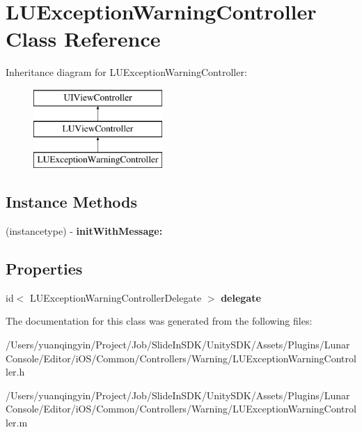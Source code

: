 \hypertarget{interface_l_u_exception_warning_controller}{}\section{L\+U\+Exception\+Warning\+Controller Class Reference}
\label{interface_l_u_exception_warning_controller}
Inheritance diagram for L\+U\+Exception\+Warning\+Controller\+:\begin{figure}[H]
\begin{center}
\leavevmode
\includegraphics[height=3.000000cm]{interface_l_u_exception_warning_controller}
\end{center}
\end{figure}
\subsection*{Instance Methods}
\begin{DoxyCompactItemize}
\item 
\mbox{\label{interface_l_u_exception_warning_controller_a66c26ff34fdbbdfbe09c7026353978eb}} 
(instancetype) -\/ {\bfseries init\+With\+Message\+:}
\end{DoxyCompactItemize}
\subsection*{Properties}
\begin{DoxyCompactItemize}
\item 
\mbox{\label{interface_l_u_exception_warning_controller_aa5c45c9e0e16a6cee2608fe260937297}} 
id$<$ L\+U\+Exception\+Warning\+Controller\+Delegate $>$ {\bfseries delegate}
\end{DoxyCompactItemize}


The documentation for this class was generated from the following files\+:\begin{DoxyCompactItemize}
\item 
/\+Users/yuanqingyin/\+Project/\+Job/\+Slide\+In\+S\+D\+K/\+Unity\+S\+D\+K/\+Assets/\+Plugins/\+Lunar\+Console/\+Editor/i\+O\+S/\+Common/\+Controllers/\+Warning/L\+U\+Exception\+Warning\+Controller.\+h\item 
/\+Users/yuanqingyin/\+Project/\+Job/\+Slide\+In\+S\+D\+K/\+Unity\+S\+D\+K/\+Assets/\+Plugins/\+Lunar\+Console/\+Editor/i\+O\+S/\+Common/\+Controllers/\+Warning/L\+U\+Exception\+Warning\+Controller.\+m\end{DoxyCompactItemize}
